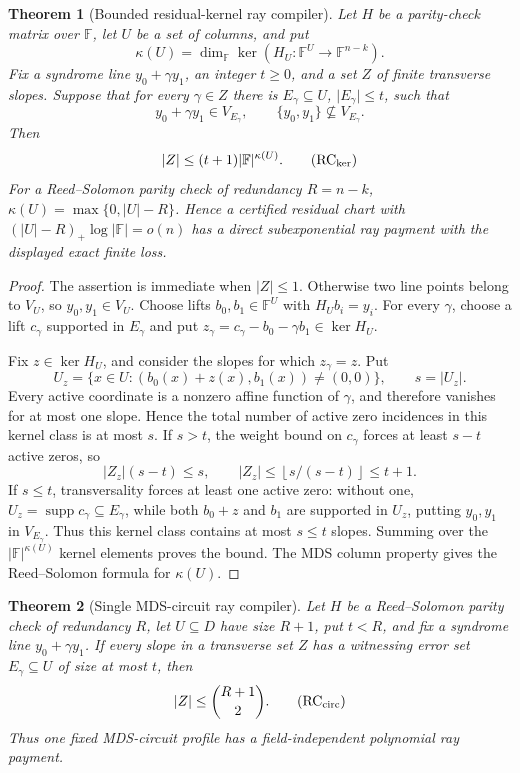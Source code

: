\documentclass[11pt,a4paper]{amsart}
\numberwithin{equation}{section}
\newtheorem{theorem}{Theorem}[section]
\theoremstyle{remark}
\DeclareMathOperator{\supp}{supp}
\newcommand{\F}{\mathbb F}
\newcommand{\abs}[1]{\lvert #1\rvert}
\newcommand{\floor}[1]{\left\lfloor #1\right\rfloor}
\begin{document}
\begin{theorem}[Bounded residual-kernel ray compiler]
\label{thm:bounded-residual-kernel-ray}
Let \(H\) be a parity-check matrix over \(\F\), let \(U\) be a set of
columns, and put
\[
 \kappa(U)=\dim_\F\ker(H_U:\F^U\longrightarrow\F^{n-k}).
\]
Fix a syndrome line \(y_0+\gamma y_1\), an integer \(t\ge0\), and a set
\(Z\) of finite transverse slopes.  Suppose that for every \(\gamma\in Z\)
there is \(E_\gamma\subseteq U\), \(\abs{E_\gamma}\le t\), such that
\[
 y_0+\gamma y_1\in V_{E_\gamma},\qquad
 \{y_0,y_1\}\not\subseteq V_{E_\gamma}.
\]
Then
\[
                  \abs Z\le(t+1)\abs{\F}^{\kappa(U)}. \tag{RC$_{\rm ker}$}
\]
For a Reed--Solomon parity check of redundancy \(R=n-k\),
\(\kappa(U)=\max\{0,\abs U-R\}\).  Hence a certified residual chart with
\((\abs U-R)_+\log\abs\F=o(n)\) has a direct subexponential ray payment
with the displayed exact finite loss.
\end{theorem}

\begin{proof}
The assertion is immediate when \(\abs Z\le1\).  Otherwise two line
points belong to \(V_U\), so \(y_0,y_1\in V_U\).  Choose lifts
\(b_0,b_1\in\F^U\) with \(H_Ub_i=y_i\).  For every \(\gamma\), choose a
lift \(c_\gamma\) supported in \(E_\gamma\) and put
\(z_\gamma=c_\gamma-b_0-\gamma b_1\in\ker H_U\).

Fix \(z\in\ker H_U\), and consider the slopes for which
\(z_\gamma=z\).  Put
\[
 U_z=\{x\in U:(b_0(x)+z(x),b_1(x))\ne(0,0)\},
 \qquad s=\abs{U_z}.
\]
Every active coordinate is a nonzero affine function of \(\gamma\), and
therefore vanishes for at most one slope.  Hence the total number of active
zero incidences in this kernel class is at most \(s\).  If \(s>t\), the
weight bound on \(c_\gamma\) forces at least \(s-t\) active zeros, so
\[
 \abs{Z_z}(s-t)\le s,\qquad
 \abs{Z_z}\le\floor{s/(s-t)}\le t+1.
\]
If \(s\le t\), transversality forces
at least one active zero: without one,
\(U_z=\supp c_\gamma\subseteq E_\gamma\), while both \(b_0+z\) and
\(b_1\) are supported in \(U_z\), putting \(y_0,y_1\) in
\(V_{E_\gamma}\).  Thus this kernel class contains at most \(s\le t\)
slopes.  Summing over the \(\abs{\F}^{\kappa(U)}\) kernel elements proves
the bound.  The MDS column property gives the Reed--Solomon formula for
\(\kappa(U)\).
\end{proof}

\begin{theorem}[Single MDS-circuit ray compiler]
\label{thm:single-mds-circuit-ray}
Let \(H\) be a Reed--Solomon parity check of redundancy \(R\), let
\(U\subseteq D\) have size \(R+1\), put \(t<R\), and fix a syndrome line
\(y_0+\gamma y_1\).  If every slope in a transverse set \(Z\) has a witnessing error set
\(E_\gamma\subseteq U\) of size at most \(t\), then
\[
                         \abs Z\le\binom{R+1}{2}.   \tag{RC$_{\rm circ}$}
\]
Thus one fixed MDS-circuit profile has a field-independent polynomial ray
payment.
\end{theorem}
\end{document}
